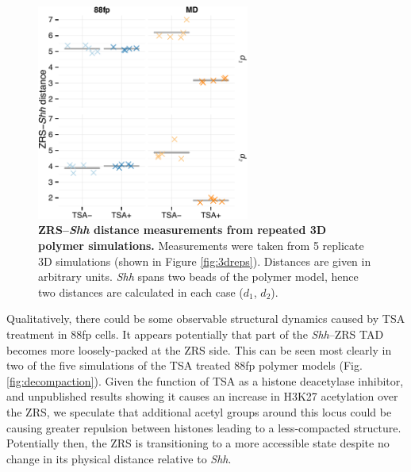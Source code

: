 \documentclass[a4paper,11pt,oneside]{book}
\begin{document}
\begin{figure}
\begin{center} 
\includegraphics[width=2.75in]{figs/3d_dists.pdf}
\captionsetup{width=\textwidth} 
\caption[ ZRS--\emph{Shh} distance measurements from repeated 3D polymer simulations. ]{ {\bf ZRS--\emph{Shh} distance measurements from repeated 3D polymer simulations. }
Measurements were taken from 5 replicate 3D simulations (shown in Figure \ref{fig:3dreps}). Distances are given in arbitrary units. \emph{Shh} spans two beads of the polymer model, hence two distances are calculated in each case ($d_1$, $d_2$).
}\label{fig:3ddist}
\end{center} 
\end{figure} 

Qualitatively, there could be some observable structural dynamics caused by TSA treatment in 88fp cells. It appears potentially that part of the \emph{Shh}--ZRS TAD becomes more loosely-packed at the ZRS side. This can be seen most clearly in two of the five simulations of the TSA treated 88fp polymer models (Fig. \ref{fig:decompaction}). Given the function of TSA as a histone deacetylase inhibitor, and unpublished results showing it causes an increase in H3K27 acetylation over the ZRS, we speculate that additional acetyl groups around this locus could be causing greater repulsion between histones leading to a less-compacted structure. Potentially then, the ZRS is transitioning to a more accessible state despite no change in its physical distance relative to \emph{Shh}.
\end{document}
